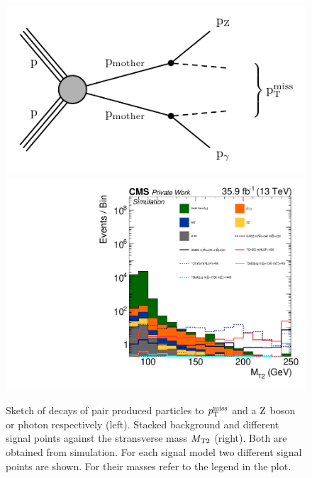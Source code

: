 \begin{figure}
 \centering
 \includegraphics[width=\pairwidth]{figures/mt2/graph}
 \includegraphics[width=\pairwidth]{figures/plots/onZ_LL_mt2_log}
 \caption{Sketch of decays of pair produced particles to $p_{\mathrm{T}}^\text{miss}$ and a $\mathrm{Z}$ boson or photon respectively (left). Stacked background and different signal points against the stransverse mass $M_{\mathrm{T2}}$ (right). Both are obtained from simulation. For each signal model two different signal points are shown. For their masses refer to the legend in the plot.}
 \label{fig:mt2}
\end{figure}


